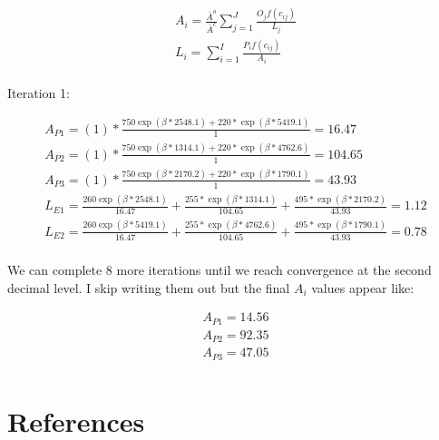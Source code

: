 \documentclass[]{elsarticle} %
\begin{document}
\begin{equation}
\begin{array}{l}
A_{i} = \frac{\bar A^{o}}{\bar A^{c}}{\sum_{j=1}^{J} \frac{O_{j}f(c_{ij})}{L_{j}}}\\
L_{i} = {\sum_{i=1}^{I} \frac{P_{i}f(c_{ij})}{A_{i}}}\\
\end{array}
\end{equation}

Iteration 1:

\begin{equation}
\begin{array}{l}
A_{P1} = (1)*\frac{750\exp(\beta*2548.1) + 220*\exp(\beta *5419.1)}{1} = 16.47\\
A_{P2} = (1)*\frac{750\exp(\beta*1314.1) + 220*\exp(\beta *4762.6)}{1} = 104.65\\
A_{P3} = (1)*\frac{750\exp(\beta*2170.2) + 220*\exp(\beta *1790.1)}{1} = 43.93\\
L_{E1} = \frac{260\exp(\beta*2548.1)}{16.47} + \frac{255*\exp(\beta *1314.1)}{104.65} + \frac{495*\exp(\beta *2170.2)}{43.93} = 1.12\\
L_{E2} = \frac{260\exp(\beta*5419.1)}{16.47} + \frac{255*\exp(\beta *4762.6)}{104.65} + \frac{495*\exp(\beta *1790.1)}{43.93} = 0.78\\
\end{array}
\end{equation}

We can complete 8 more iterations until we reach convergence at the
second decimal level. I skip writing them out but the final \(A_{i}\)
values appear like:

\begin{equation}
\begin{array}{l}
A_{P1} = 14.56\\
A_{P2} = 92.35\\
A_{P3} = 47.05\\
\end{array}
\end{equation}

\newpage

\hypertarget{references}{%
\section*{References}\label{references}}
\end{document}
